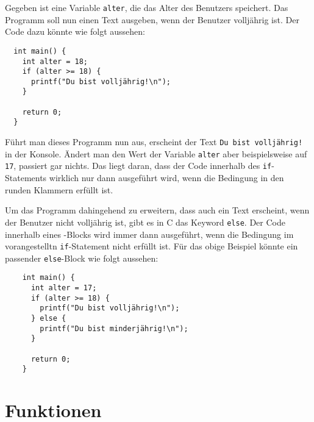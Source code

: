 \documentclass[11pt]{article}
\begin{document}
\begin{bsp}
  Gegeben ist eine Variable \texttt{alter}, die das Alter des Benutzers speichert. Das Programm soll nun einen Text ausgeben,
  wenn der Benutzer volljährig ist. Der Code dazu könnte wie folgt aussehen:
  \begin{verbatim}
  int main() {
    int alter = 18;
    if (alter >= 18) {
      printf("Du bist volljährig!\n");
    }

    return 0;
  }
  \end{verbatim}

  Führt man dieses Programm nun aus, erscheint der Text \texttt{Du bist volljährig!} in der Konsole.
  Ändert man den Wert der Variable \texttt{alter} aber beispielsweise auf \texttt{17}, passiert gar nichts.
  Das liegt daran, dass der Code innerhalb des \texttt{if}-Statements wirklich nur dann ausgeführt wird, wenn die
  Bedingung in den runden Klammern erfüllt ist.

  Um das Programm dahingehend zu erweitern, dass auch ein Text erscheint, wenn der Benutzer nicht volljährig ist, gibt es
  in C das Keyword \texttt{else}. Der Code innerhalb eines -Blocks wird immer dann ausgeführt, wenn die
  Bedingung im vorangestelltn \texttt{if}-Statement nicht erfüllt ist. Für das obige Beispiel könnte ein passender
  \texttt{else}-Block wie folgt aussehen:

  \begin{verbatim}
    int main() {
      int alter = 17;
      if (alter >= 18) {
        printf("Du bist volljährig!\n");
      } else {
        printf("Du bist minderjährig!\n");
      }
  
      return 0;
    }
    \end{verbatim}
\end{bsp}

\section{Funktionen}{\label{sec:funktionen}}
\end{document}
